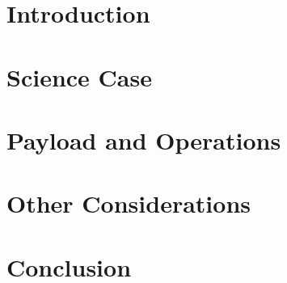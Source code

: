 \documentclass[preprint]{aastex631}
\begin{document}
\begin{abstract}
\end{abstract}

\section{Introduction} 
\label{sec:intro}


%

\section{Science Case}
\label{sec:science}


%

\section{Payload and Operations}
\label{sec:payload}


\section{Other Considerations}
\label{sec:otherconsiderations}




\section{Conclusion}
\end{document}
